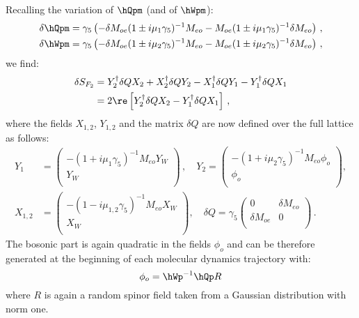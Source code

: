 Recalling the variation of $\hQpm$ (and of $\hWpm$):
\begin{equation}
  \label{eq:mt5}
  \begin{split}
    \delta\hQpm &= \gamma_5\left(-\delta M_{oe}(1\pm i\mu_1\gamma_5 )^{-1}M_{eo} -
    M_{oe}(1\pm i\mu_1\gamma_5 )^{-1}\delta M_{eo}\right)\, , \\
  \delta \hWpm &= \gamma_5\left(-\delta M_{oe}(1\pm i\mu_2\gamma_5 )^{-1}M_{eo} -
    M_{oe}(1\pm i\mu_2\gamma_5)^{-1}\delta M_{eo}\right)\, ,
  \end{split}
\end{equation}
we find:
\begin{equation}
  \label{eq:mt6}
  \begin{split}
    \delta S_{F_2} &= Y_2^\dagger \delta Q X_2 + X_2^\dagger\delta QY_2 -X_1^\dagger\delta Q Y_1 -
    Y_1^\dagger\delta Q X_1\\
    &= 2\re\left[Y_2^\dagger \delta Q X_2 - Y_1^\dagger\delta Q X_1 \right]\, ,
  \end{split}
\end{equation}
where the fields $X_{1,2}$, $Y_{1,2}$ and the matrix $\delta Q$ are now
defined over the full lattice as follows:
\begin{equation}
  \label{eq:mt7}
  \begin{split}
    Y_1 &= 
    \begin{pmatrix}
      -(1+i\mu_{1}\gamma_5)^{-1}M_{eo}Y_W \\ Y_W\\
    \end{pmatrix}\, ,\quad
    Y_2 = 
    \begin{pmatrix}
       -(1+i\mu_{2}\gamma_5)^{-1}M_{eo}\phi_o \\ \phi_o\\
    \end{pmatrix},\\
    X_{1,2} &= 
    \begin{pmatrix}
      -(1-i\mu_{1,2}\gamma_5)^{-1}M_{eo}X_W \\ X_W\\
    \end{pmatrix},\quad
    \delta Q = \gamma_5
    \begin{pmatrix}
      0 & \delta M_{eo}\\
      \delta M_{oe} & 0\\
    \end{pmatrix}\, .
  \end{split}
\end{equation}
The bosonic part is again quadratic in the fields $\phi_o$ and can be
therefore generated at the beginning of each molecular dynamics
trajectory with:
\begin{equation}
  \label{eq:mt8}
  \phi_o = \hWp^{-1}\hQp R
\end{equation}
where $R$ is again a random spinor field taken from a Gaussian
distribution with norm one.
